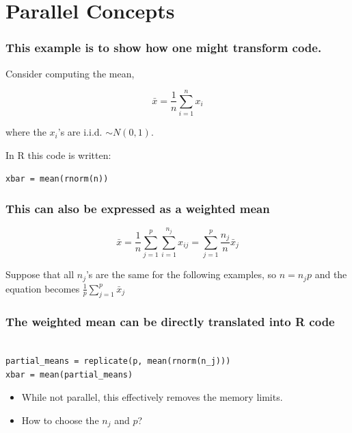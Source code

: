 \documentclass{beamer}
\begin{document}
\section{Parallel Concepts}
\begin{frame}[fragile]

\frametitle{This example is to show how one might transform code.}

Consider computing the mean,

\begin{equation}
    \bar{x} = \frac{1}{n} \sum_{i = 1}^n x_i
\label{eq:mean}
\end{equation}

where the $x_i$'s are i.i.d. $\sim N(0, 1)$. 
    
In R this code is written:

\begin{verbatim}
xbar = mean(rnorm(n))
\end{verbatim}


\end{frame}
\begin{frame}

    \frametitle{This can also be expressed as a weighted mean}

\begin{equation}
    \bar{x} = \frac{1}{n} \sum_{j = 1}^p \sum_{i = 1}^{n_j} x_{ij}
    = \sum_{j = 1}^p \frac{n_j}{n} \bar{x}_j
\label{eq:mean_partial}
\end{equation}

Suppose that all $n_j$'s are the same for the following examples, so $n =
    n_j p$ and the equation becomes $\frac{1}{p} \sum_{j = 1}^p \bar{x}_j$

\end{frame}
\begin{frame}[fragile]

    \frametitle{The weighted mean can be directly translated into R code}

\begin{verbatim}

partial_means = replicate(p, mean(rnorm(n_j)))
xbar = mean(partial_means)

\end{verbatim}

\pause 

    \begin{itemize}
        \item While not parallel, this effectively removes the memory limits.
        \item How to choose the $n_j$ and $p$?
    \end{itemize}

\end{frame}
\end{document}
